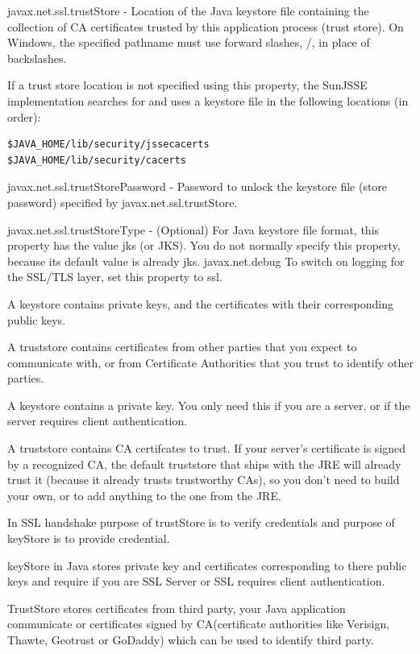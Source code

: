 \documentclass[a4paper,11pt,french]{article}
\begin{document}
javax.net.ssl.trustStore - Location of the Java keystore file containing the collection of CA certificates trusted by this application process (trust store). On Windows, the specified pathname must use forward slashes, /, in place of backslashes.

If a trust store location is not specified using this property, the SunJSSE implementation searches for and uses a keystore file in the following locations (in order):

\begin{verbatim}
$JAVA_HOME/lib/security/jssecacerts
$JAVA_HOME/lib/security/cacerts
\end{verbatim}
javax.net.ssl.trustStorePassword - Password to unlock the keystore file (store password) specified by javax.net.ssl.trustStore.

javax.net.ssl.trustStoreType - (Optional) For Java keystore file format, this property has the value jks (or JKS). You do not normally specify this property, because its default value is already jks. javax.net.debug To switch on logging for the SSL/TLS layer, set this property to ssl.



A keystore contains private keys, and the certificates with their corresponding public keys.

A truststore contains certificates from other parties that you expect to communicate with, or from Certificate Authorities that you trust to identify other parties.


A keystore contains a private key. You only need this if you are a server, or if the server requires client authentication.

A truststore contains CA certifcates to trust. If your server’s certificate is signed by a recognized CA, the default truststore that ships with the JRE will already trust it (because it already trusts trustworthy CAs), so you don’t need to build your own, or to add anything to the one from the JRE.







In SSL handshake purpose of trustStore is to verify credentials and purpose of keyStore is to provide credential.

keyStore in Java stores private key and certificates corresponding to there public keys and require if you are SSL Server or SSL requires client authentication.

TrustStore stores certificates from third party, your Java application communicate or certificates signed by CA(certificate authorities like Verisign, Thawte, Geotrust or GoDaddy) which can be used to identify third party.
\end{document}
